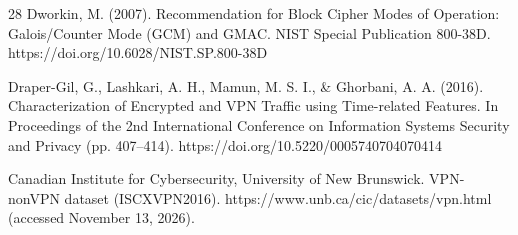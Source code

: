 \documentclass[preprint,12pt]{elsarticle}
\theoremstyle{plain}
\begin{document}
\begin{thebibliography}{28}
Dworkin, M. (2007). Recommendation for Block Cipher Modes of Operation: Galois/Counter Mode (GCM) and GMAC. NIST Special Publication 800-38D. https://doi.org/10.6028/NIST.SP.800-38D

Draper-Gil, G., Lashkari, A. H., Mamun, M. S. I., \& Ghorbani, A. A. (2016). Characterization of Encrypted and VPN Traffic using Time-related Features. In Proceedings of the 2nd International Conference on Information Systems Security and Privacy (pp. 407--414). https://doi.org/10.5220/0005740704070414

Canadian Institute for Cybersecurity, University of New Brunswick. VPN-nonVPN dataset (ISCXVPN2016). https://www.unb.ca/cic/datasets/vpn.html (accessed November 13, 2026).

\end{thebibliography}
\end{document}
